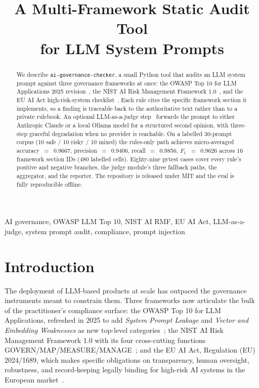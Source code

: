 \documentclass[conference]{IEEEtran}
\begin{document}
\title{A Multi-Framework Static Audit Tool\\for LLM System Prompts}

\author{
}

\maketitle

\begin{abstract}
We describe \texttt{ai-governance-checker}, a small Python tool that
audits an LLM system prompt against three governance frameworks at
once: the OWASP Top 10 for LLM Applications 2025
revision~\cite{owasp_llm_2025}, the NIST AI Risk Management Framework
1.0~\cite{nist_ai_rmf}, and the EU AI Act high-risk-system
checklist~\cite{eu_ai_act}. Each rule cites the specific framework
section it implements, so a finding is traceable back to the
authoritative text rather than to a private rulebook. An optional
LLM-as-a-judge step~\cite{zheng2023judging} forwards the prompt to
either Anthropic Claude or a local Ollama model for a structured
second opinion, with three-step graceful degradation when no
provider is reachable. On a labelled 30-prompt corpus (10 safe / 10
risky / 10 mixed) the rules-only path achieves micro-averaged
accuracy~$=$~0.9667, precision~$=$~0.9406,
recall~$=$~0.9856, $F_1$~$=$~0.9626 across 16 framework section
IDs (480 labelled cells). Eighty-nine pytest cases cover every rule's
positive and negative branches, the judge module's three fallback
paths, the aggregator, and the reporter. The repository is released
under MIT and the eval is fully reproducible offline.
\end{abstract}

\begin{IEEEkeywords}
AI governance, OWASP LLM Top 10, NIST AI RMF, EU AI Act,
LLM-as-a-judge, system prompt audit, compliance, prompt injection
\end{IEEEkeywords}

\section{Introduction}

The deployment of LLM-based products at scale has outpaced the
governance instruments meant to constrain them. Three frameworks now
articulate the bulk of the practitioner's compliance surface: the
OWASP Top 10 for LLM Applications, refreshed in 2025 to add
\emph{System Prompt Leakage} and \emph{Vector and Embedding
Weaknesses} as new top-level categories~\cite{owasp_llm_2025}; the
NIST AI Risk Management Framework 1.0 with its four cross-cutting
functions GOVERN/MAP/MEASURE/MANAGE~\cite{nist_ai_rmf}; and the
EU AI Act, Regulation (EU) 2024/1689, which makes specific
obligations on transparency, human oversight, robustness, and
record-keeping legally binding for high-risk AI systems in the
European market~\cite{eu_ai_act}.
\end{document}
